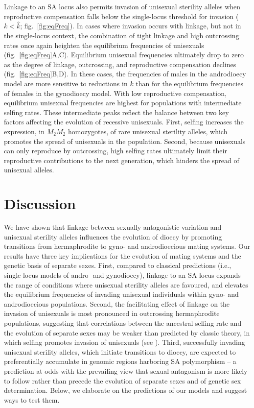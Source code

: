 \documentclass{article}
\begin{document}
Linkage to an SA locus also permits invasion of unisexual sterility alleles when reproductive compensation falls below the single-locus threshold for invasion ($k < \hat{k}$; fig.~\ref{fig:eqFreq}). In cases where invasion occurs with linkage, but not in the single-locus context, the combination of tight linkage and high outcrossing rates once again heighten the equilibrium frequencies of unisexuals (fig.~\ref{fig:eqFreq}A,C). Equilibrium unisexual frequencies ultimately drop to zero as the degree of linkage, outcrossing, and reproductive compensation declines (fig.~\ref{fig:eqFreq}B,D). In these cases, the frequencies of males in the androdioecy model are more sensitive to reductions in $k$ than for the equilibrium frequencies of females in the gynodioecy model. With low reproductive compensation, equilibrium unisexual frequencies are highest for populations with intermediate selfing rates. These intermediate peaks reflect the balance between two key factors affecting the evolution of recessive unisexuals. First, selfing increases the expression, in $M_2 M_2$ homozygotes, of rare unisexual sterility alleles, which promotes the spread of unisexuals in the population. Second, because unisexuals can only reproduce by outcrossing, high selfing rates ultimately limit their reproductive contributions to the next generation, which hinders the spread of unisexual alleles. 





\section*{Discussion}

We have shown that linkage between sexually antagonistic variation and unisexual sterility alleles influences the evolution of dioecy by promoting transitions from hermaphrodite to gyno- and androdioecious mating systems. Our results have three key implications for the evolution of mating systems and the genetic basis of separate sexes. First, compared to classical predictions (i.e., single-locus models of andro- and gynodioecy), linkage to an SA locus expands the range of conditions where unisexual sterility alleles are favoured, and elevates the equilibrium frequencies of invading unisexual individuals within gyno- and androdioecious populations. Second, the facilitating effect of linkage on the invasion of unisexuals is most pronounced in outcrossing hermaphrodite populations, suggesting that correlations between the ancestral selfing rate and the evolution of separate sexes may be weaker than predicted by classic theory, in which selfing promotes invasion of unisexuals (see \citealt{Charlesworth1978a}). Third, successfully invading unisexual sterility alleles, which initiate transitions to dioecy, are expected to preferentially accumulate in genomic regions harboring SA polymorphism -- a prediction at odds with the prevailing view that sexual antagonism is more likely to follow rather than precede the evolution of separate sexes and of genetic sex determination. Below, we elaborate on the predictions of our models and suggest ways to test them.
\end{document}
